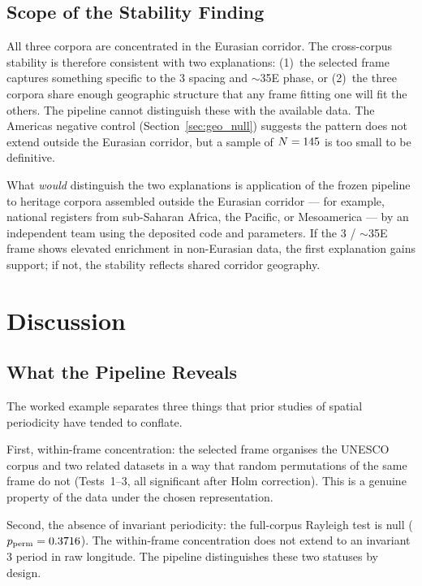 \documentclass[12pt,a4paper]{article}
\newcommand{\degr}{\ifmmode{^\circ}\else\textdegree{}\fi}
\begin{document}
\subsection{Scope of the Stability Finding}

All three corpora are concentrated in the Eurasian corridor. The
cross-corpus stability is therefore consistent with two explanations:
(1)~the selected frame captures something specific to the 3\degr{}
spacing and $\sim$35\degr{}E phase, or (2)~the three corpora share
enough geographic structure that any frame fitting one will fit the
others. The pipeline cannot distinguish these with the available data.
The Americas negative control (Section~\ref{sec:geo_null}) suggests the
pattern does not extend outside the Eurasian corridor, but a sample of
$N = 145$ is too small to be definitive.

What \emph{would} distinguish the two explanations is application of the
frozen pipeline to heritage corpora assembled outside the Eurasian
corridor — for example, national registers from sub-Saharan Africa, the
Pacific, or Mesoamerica — by an independent team using the deposited
code and parameters. If the 3\degr{} / $\sim$35\degr{}E frame shows
elevated enrichment in non-Eurasian data, the first explanation gains
support; if not, the stability reflects shared corridor geography.

\section{Discussion}
\label{sec:discussion}

\subsection{What the Pipeline Reveals}

The worked example separates three things that prior studies of spatial
periodicity have tended to conflate.

First, within-frame concentration: the selected frame organises the
UNESCO corpus and two related datasets in a way that random permutations
of the same frame do not (Tests~1--3, all significant after Holm
correction). This is a genuine property of the data under the chosen
representation.

Second, the absence of invariant periodicity: the full-corpus Rayleigh
test is null ($p_{\mathrm{perm}} = 0.3716$). The
within-frame concentration does not extend to an invariant 3\degr{}
period in raw longitude. The pipeline distinguishes these two statuses
by design.
\end{document}
